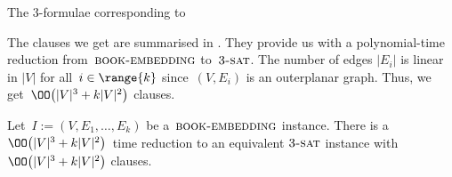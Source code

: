 \begin{table}[tb]
\caption[\CNF translation of \probBook]{The 3-\CNF formulae corresponding to \probBook}
\label{table:sat}
\end{table}

The clauses we get are summarised in . They
provide us with a polynomial-time reduction from~$\textsc{book-embedding}$ to~$\textsc{3-sat}$.
The number of edges $|E_i|$ is linear in $|V|$ for all~$i \in \range{k}$ since~$(V, E_i)$ is an outerplanar graph.
Thus, we get~$\OO\bigl(|V|^3 + k|V|^2\bigr)$ clauses.

\begin{theorem}
Let~$I := (V, E_1, \dotsc, E_k)$ be a~$\textsc{book-embedding}$ instance. There is a $\OO\bigl(|V|^3 + k|V|^2\bigr)$~time reduction
to an equivalent $\textsc{3-sat}$ instance with~$\OO\bigl(|V|^3 + k|V|^2\bigr)$ clauses.
\end{theorem}

